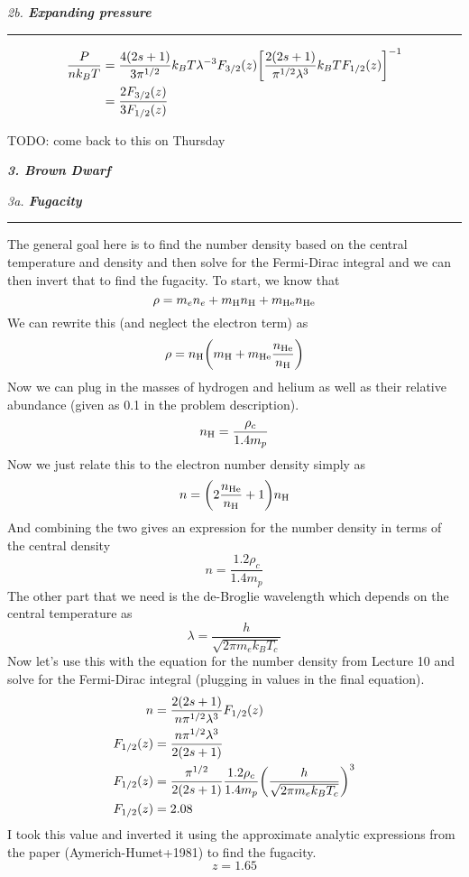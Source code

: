\documentclass[12pt, letterpaper, twoside]{article}
\newcommand{\question}[1]{{\noindent \it #1}}
\newcommand{\answer}[1]{
    \par\noindent\rule{\textwidth}{0.4pt}#1\vspace{0.5cm}
}
\newcommand{\todo}[1]{{\color{red}\begin{center}TODO: #1\end{center}}}
\begin{document}
\question{2b. \textbf{Expanding pressure}}
\answer{
    \begin{align}
        \frac{P}{n k_B T} &= \frac{4(2s + 1)}{3 \pi^{1/2}} k_B T \lambda^{-3} F_{3/2}(z) \qty[\frac{2(2s + 1)}{\pi^{1/2} \lambda^3} k_B T F_{1/2}(z)]^{-1} \\
                          &= \frac{2 F_{3/2}(z)}{3 F_{1/2}(z)}
    \end{align}
    \todo{come back to this on Thursday}
}

\question{\textbf{3. Brown Dwarf}}

\question{3a. \textbf{Fugacity}}
\answer{
    The general goal here is to find the number density based on the central temperature and density and then solve for the Fermi-Dirac integral and we can then invert that to find the fugacity. To start, we know that
    \begin{equation}
        \rho = m_e n_e + m_{\rm H} n_{\rm H} + m_{\rm He} n_{\rm He}
    \end{equation}
    We can rewrite this (and neglect the electron term) as
    \begin{equation}
        \rho = n_{\rm H} \qty(m_{\rm H} + m_{\rm He} \frac{n_{\rm He}}{n_{\rm H}})
    \end{equation}
    Now we can plug in the masses of hydrogen and helium as well as their relative abundance (given as 0.1 in the problem description).
    \begin{equation}
        n_{\rm H} = \frac{\rho_c}{1.4 m_p}
    \end{equation}
    Now we just relate this to the electron number density simply as
    \begin{equation}
        n = \qty(2 \frac{n_{\rm He}}{n_{\rm H}} + 1) n_{\rm H}
    \end{equation}
    And combining the two gives an expression for the number density in terms of the central density
    \begin{equation}
        n = \frac{1.2 \rho_c}{1.4 m_p}
    \end{equation}
    The other part that we need is the de-Broglie wavelength which depends on the central temperature as
    \begin{equation}
        \lambda = \frac{h}{\sqrt{2 \pi m_e k_B T_c}}
    \end{equation}
    Now let's use this with the equation for the number density from Lecture 10 and solve for the Fermi-Dirac integral (plugging in values in the final equation).
    \begin{align}
        n &= \frac{2(2s + 1)}{n \pi^{1/2} \lambda^3} F_{1/2}(z) \\
        F_{1/2}(z) &= \frac{n \pi^{1/2} \lambda^3}{2(2s + 1)} \\
        F_{1/2}(z) &= \frac{\pi^{1/2}}{2(2s + 1)} \frac{1.2 \rho_c}{1.4 m_p} \qty(\frac{h}{\sqrt{2 \pi m_e k_B T_c}})^3 \\
        F_{1/2}(z) &= 2.08
    \end{align}
    I took this value and inverted it using the approximate analytic expressions from the paper (Aymerich-Humet+1981) to find the fugacity.
    \begin{equation}
        \boxed{ z = 1.65 }
    \end{equation}
}
\end{document}
